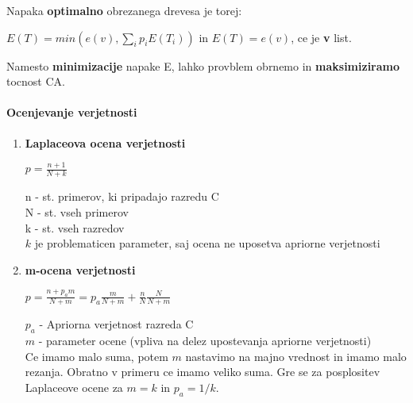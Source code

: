\documentclass{article}
\begin{document}
\begin{multicols}{2}
\begin{enumerate}
		      Napaka \textbf{optimalno} obrezanega drevesa je torej:
		      \begin{center}
			      \begin{math}
				      E(T) = min(e(v), \sum_i p_i E(T_i))
			      \end{math} in
			      \begin{math}
				      E(T) = e(v)
			      \end{math}, ce je \textbf{v} list.
		      \end{center}

		      Namesto \textbf{minimizacije} napake E, lahko provblem obrnemo in \textbf{maksimiziramo} tocnost CA.
	\end{enumerate}

	\paragraph{Ocenjevanje verjetnosti}

	\begin{enumerate}
		\item \textbf{Laplaceova ocena verjetnosti}
		      \begin{center}
			      \begin{math}
				      p = \frac{n+1}{N+k}
			      \end{math}
		      \end{center}

		      n - st. primerov, ki pripadajo razredu C\\
		      N - st. vseh primerov\\
		      k - st. vseh razredov\\
		      $k$ je problematicen parameter, saj ocena ne uposetva apriorne verjetnosti

		\item \textbf{m-ocena verjetnosti}
		      \begin{center}
			      \begin{math}
				      p = \frac{n+ p_a m}{N+m} = p_a \frac{m}{N+m} + \frac{n}{N}\frac{N}{N + m}
			      \end{math}
		      \end{center}

		      $p_a$ - Apriorna verjetnost razreda C\\
		      $m$ - parameter ocene (vpliva na delez upostevanja apriorne verjetnosti)\\
		      Ce imamo malo suma, potem $m$ nastavimo na majno vrednost in imamo malo rezanja. Obratno v primeru ce imamo veliko suma.
		      Gre se za posplositev Laplaceove ocene za $m=k$ in $p_a = 1/k$.
	\end{enumerate}

\end{multicols}
\end{document}
